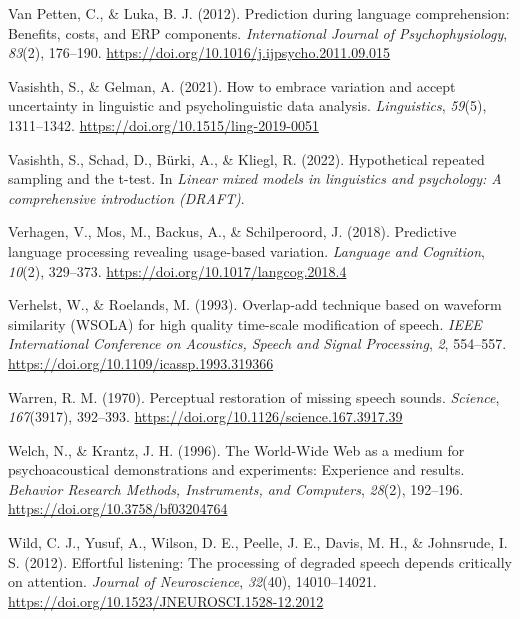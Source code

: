 \documentclass[a4paper, nobind]{templates/ociamthesis}
\newlength{\cslhangindent}
\newenvironment{CSLReferences}[2] %
 {%
  \setlength{\parindent}{0pt}
  \ifodd #1
  \let\oldpar\par
  \def\par{\hangindent=\cslhangindent\oldpar}
  \fi
  \setlength{\parskip}{1mm}
  \setlength{\baselineskip}{6mm}
 }%
 {}
\begin{document}
\begin{CSLReferences}{1}{0}
\leavevmode{}%
Van Petten, C., \& Luka, B. J. (2012). {Prediction during language comprehension: Benefits, costs, and ERP components}. \emph{International Journal of Psychophysiology}, \emph{83}(2), 176--190. \url{https://doi.org/10.1016/j.ijpsycho.2011.09.015}

\leavevmode{}%
Vasishth, S., \& Gelman, A. (2021). {How to embrace variation and accept uncertainty in linguistic and psycholinguistic data analysis}. \emph{Linguistics}, \emph{59}(5), 1311--1342. \url{https://doi.org/10.1515/ling-2019-0051}

\leavevmode{}%
Vasishth, S., Schad, D., Bürki, A., \& Kliegl, R. (2022). Hypothetical repeated sampling and the t-test. In \emph{Linear mixed models in linguistics and psychology: A comprehensive introduction (DRAFT)}.

\leavevmode{}%
Verhagen, V., Mos, M., Backus, A., \& Schilperoord, J. (2018). Predictive language processing revealing usage-based variation. \emph{Language and Cognition}, \emph{10}(2), 329--373. \url{https://doi.org/10.1017/langcog.2018.4}

\leavevmode{}%
Verhelst, W., \& Roelands, M. (1993). {Overlap-add technique based on waveform similarity (WSOLA) for high quality time-scale modification of speech}. \emph{IEEE International Conference on Acoustics, Speech and Signal Processing}, \emph{2}, 554--557. \url{https://doi.org/10.1109/icassp.1993.319366}

\leavevmode{}%
Warren, R. M. (1970). Perceptual restoration of missing speech sounds. \emph{Science}, \emph{167}(3917), 392--393. \url{https://doi.org/10.1126/science.167.3917.39}

\leavevmode{}%
Welch, N., \& Krantz, J. H. (1996). {The World-Wide Web as a medium for psychoacoustical demonstrations and experiments: Experience and results}. \emph{Behavior Research Methods, Instruments, and Computers}, \emph{28}(2), 192--196. \url{https://doi.org/10.3758/bf03204764}

\leavevmode{}%
Wild, C. J., Yusuf, A., Wilson, D. E., Peelle, J. E., Davis, M. H., \& Johnsrude, I. S. (2012). {Effortful listening: The processing of degraded speech depends critically on attention}. \emph{Journal of Neuroscience}, \emph{32}(40), 14010--14021. \url{https://doi.org/10.1523/JNEUROSCI.1528-12.2012}


\end{CSLReferences}
\end{document}
